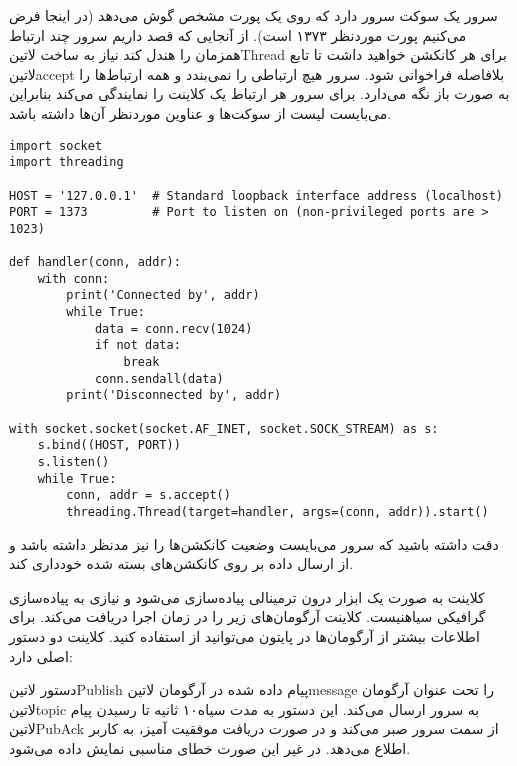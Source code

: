 \documentclass[]{../assignment}
\begin{document}

  سرور یک سوکت سرور دارد که روی یک پورت مشخص گوش می‌دهد (در اینجا فرض می‌کنیم پورت موردنظر ۱۳۷۳ است). از آنجایی که قصد داریم سرور چند ارتباط همزمان را هندل کند نیاز به ساخت ‌لاتین{Thread} برای هر کانکشن خواهید داشت
  تا تابع ‌لاتین{accept} بلافاصله فراخوانی شود. سرور هیچ ارتباطی را نمی‌بندد و همه ارتباط‌ها را به صورت باز نگه می‌دارد. برای سرور هر ارتباط یک کلاینت را نمایندگی می‌کند بنابراین می‌بایست لیست از سوکت‌ها و عناوین موردنظر آن‌ها داشته باشد.

  \begin{latin}
  \begin{verbatim}
import socket
import threading

HOST = '127.0.0.1'  # Standard loopback interface address (localhost)
PORT = 1373         # Port to listen on (non-privileged ports are > 1023)

def handler(conn, addr):
    with conn:
        print('Connected by', addr)
        while True:
            data = conn.recv(1024)
            if not data:
                break
            conn.sendall(data)
        print('Disconnected by', addr)

with socket.socket(socket.AF_INET, socket.SOCK_STREAM) as s:
    s.bind((HOST, PORT))
    s.listen()
    while True:
        conn, addr = s.accept()
        threading.Thread(target=handler, args=(conn, addr)).start()
  \end{verbatim}
  \end{latin}

  دقت داشته باشید که سرور می‌بایست وضعیت کانکشن‌ها را نیز مدنظر داشته باشد و از ارسال داده بر روی کانکشن‌های بسته شده خودداری کند.


  کلاینت به صورت یک ابزار درون ترمینالی پیاده‌سازی می‌شود و نیازی به پیاده‌سازی گرافیکی ‌سیاه{نیست}.
  کلاینت آرگومان‌های زیر را در زمان اجرا دریافت می‌کند. برای اطلاعات بیشتر از آرگومان‌ها در پایتون می‌توانید از  استفاده کنید.
  کلاینت دو دستور اصلی دارد:

  دستور ‌لاتین{Publish} پیام داده شده در آرگومان ‌لاتین{message} را تحت عنوان آرگومان ‌لاتین{topic} به سرور ارسال می‌کند.
  این دستور به مدت ‌سیاه{۱۰ ثانیه} تا رسیدن پیام ‌لاتین{PubAck} از سمت سرور صبر می‌کند و در صورت دریافت موفقیت آمیز، به کاربر اطلاع می‌دهد.
  در غیر این صورت خطای مناسبی نمایش داده می‌شود.
\end{document}

